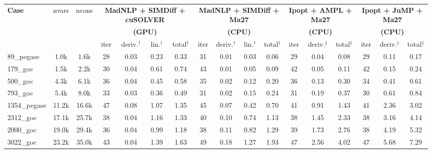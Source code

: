 \begin{tabular}{|l|c|c|cccc|cccc|ccc|ccc|}
  \hline
  \multirow{3}{*}{\textbf{Case}}
  & \multirow{3}{*}{nvars}
  & \multirow{3}{*}{ncons}
  & \multicolumn{4}{c|}{\textbf{MadNLP + SIMDiff + cuSOLVER}}
  & \multicolumn{4}{c|}{\textbf{MadNLP + SIMDiff + Ma27}}
  & \multicolumn{3}{c|}{\textbf{Ipopt + AMPL + Ma27}}
  & \multicolumn{3}{c|}{\textbf{Ipopt + JuMP + Ma27}}\\
  & & &\multicolumn{4}{c|}{\textbf{(GPU)}} &\multicolumn{4}{c|}{\textbf{(CPU)}} &\multicolumn{3}{c|}{\textbf{(CPU)}}&\multicolumn{3}{c|}{\textbf{(CPU)}}
  \\
  \cline{4-17}
  & & 
  & iter & deriv.$^\dag$ & lin.$^\dag$ & total$^\dag$
  & iter & deriv.$^\dag$ & lin.$^\dag$ & total$^\dag$
  & iter & deriv.$^\ddag$ & total$^\ddag$
  & iter & deriv.$^\ddag$ & total$^\ddag$
  \\
  \hline
89\_pegase 
&   1.0k
&   1.6k
& 28 
&  0.03
&  0.23
&  0.33
& 31 
&  0.01
&  0.03
&  0.06
& 29 
&  0.04
&  0.08
& 29 
&  0.11
&  0.17
\\

179\_goc 
&   1.5k
&   2.2k
& 30 
&  0.04
&  0.61
&  0.74
& 43 
&  0.01
&  0.05
&  0.09
& 42 
&  0.05
&  0.11
& 42 
&  0.15
&  0.24
\\

500\_goc 
&   4.3k
&   6.1k
& 36 
&  0.04
&  0.45
&  0.58
& 35 
&  0.02
&  0.12
&  0.20
& 36 
&  0.13
&  0.30
& 34 
&  0.41
&  0.61
\\

793\_goc 
&   5.4k
&   8.0k
& 33 
&  0.03
&  0.36
&  0.49
& 31 
&  0.02
&  0.15
&  0.24
& 31 
&  0.19
&  0.37
& 30 
&  0.61
&  0.84
\\

1354\_pegase 
&  11.2k
&  16.6k
& 47 
&  0.08
&  1.07
&  1.35
& 45 
&  0.07
&  0.42
&  0.70
& 41 
&  0.91
&  1.43
& 41 
&  2.36
&  3.02
\\
\hline
2312\_goc 
&  17.1k
&  25.7k
& 38 
&  0.04
&  1.16
&  1.33
& 40 
&  0.10
&  0.74
&  1.13
& 38 
&  1.45
&  2.33
& 38 
&  3.16
&  4.14
\\

2000\_goc 
&  19.0k
&  29.4k
& 36 
&  0.04
&  0.99
&  1.18
& 38 
&  0.11
&  0.82
&  1.29
& 39 
&  1.73
&  2.76
& 38 
&  4.19
&  5.32
\\

3022\_goc 
&  23.2k
&  35.0k
& 43 
&  0.04
&  1.39
&  1.63
& 49 
&  0.18
&  1.27
&  1.93
& 47 
&  2.56
&  4.02
& 47 
&  5.68
&  7.29
\\


\end{tabular}
